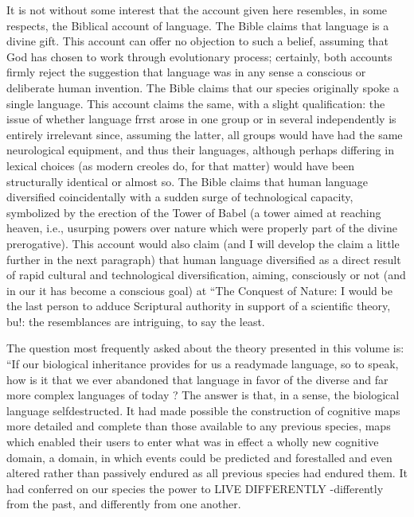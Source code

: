 It is not without some interest that the account given here resembles, in some respects, the Biblical account of language. The Bible claims that language is a divine gift. This account can offer no objection to such a belief, assuming that God has chosen to work through evolutionary process; certainly, both accounts firmly reject the suggestion that language was in any sense a conscious or deliberate human invention. The Bible claims that our species originally spoke a single language. This account claims the same, with a slight qualifi\-cation: the issue of whether language frrst arose in one group or in several independently is entirely irrelevant since, assuming the latter, all groups would have had the same neurological equipment, and thus their languages, although perhaps differing in lexical choices (as modern creoles do, for that matter) would have been structurally identical or almost so. The Bible claims that human language diversified coinci\-dentally with a sudden surge of technological capacity, symbolized
by the erection of the Tower of Babel (a tower aimed at reaching heaven, i.e., usurping powers over nature which were properly part of the divine prerogative). This account would also claim (and I will develop the claim a little further in the next paragraph) that human language diversified as a direct result of rapid cultural and technological diversification, aiming, consciously or not (and in our  it has become a conscious goal) at ``The Conquest of Nature: I would be the last person to adduce Scriptural authority in support of a scientific theory, bu!: the resemblances are intriguing, to say the least.

The question most frequently asked about the theory presented in this volume is: ``If our biological inheritance provides for us a ready\-made language, so to speak, how is it that we ever abandoned that language in favor of the diverse and far more complex languages of today ? The answer is that, in a sense, the biological language self\-destructed. It had made possible the construction of cognitive maps more detailed and complete than those available to any previous species, maps which enabled their users to enter what was in effect a wholly new cognitive domain, a domain, in which events could be predicted and forestalled and even altered rather than passively endured as all previous species had endured them. It had conferred on our species the power to LIVE DIFFERENTLY {}-differently from the past, and differently from one another.

